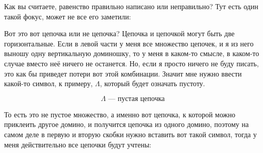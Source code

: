 \documentclass[russian]{lecture-notes}
\theoremstyle{definition}
\begin{document}
\begin{enumerate}
		Как вы считаете, равенство правильно написано или неправильно? Тут есть один такой фокус, может не все его заметили:
		
		\begin{figure}[H]
			\centering
		\end{figure}
		
		Вот это вот цепочка или не цепочка? Цепочка и цепочкой могут быть две горизонтальные. Если в левой части у меня все множество цепочек, и я из него выношу одну вертикальную доминошку, то у меня в каком-то смысле, в каком-то случае вместо неё ничего не останется. Но, если я просто ничего не буду писать, это как бы приведет потери вот этой комбинации. Значит мне нужно ввести какой-то символ, к примеру, $\Lambda$, который будет означать пустоту.
		
		\[
			\Lambda \text{~--- пустая цепочка}
		\]
		
		То есть это не пустое множество, а именно вот цепочка, к которой можно приклеить другое домино, и получится цепочка из одного домино, поэтому на самом деле в первую и вторую скобки нужно вставить вот такой символ, тогда у меня действительно все цепочки будут учтены:
		
		\begin{figure}[H]
			\hfill
\end{figure}
\end{enumerate}
\end{document}
